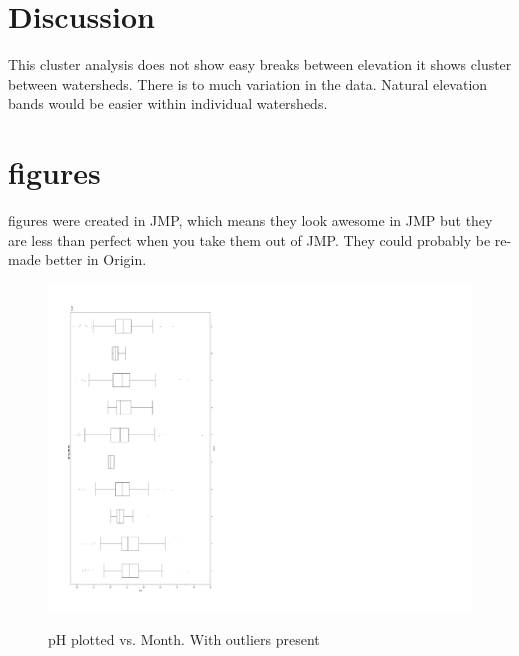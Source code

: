 \documentclass[11pt]{article} %
\begin{document}
\section{Discussion}
This cluster analysis does not show easy breaks between elevation it shows cluster between watersheds.  There is to much variation in the data. Natural elevation bands would be easier within individual watersheds.
\pagebreak

\section{figures}
figures were created in JMP, which means they look awesome in JMP but they are less than perfect when you take them out of JMP.  They could probably be re-made better in Origin.
\begin{figure}[h!]
  \caption{pH plotted vs. Month.  With outliers present}
  \includegraphics[width=11 in,clip=true,trim=0 30 150 40]{CAgraph1}\\
\label{fig:figure1}
\end{figure}
\pagebreak
\end{document}
